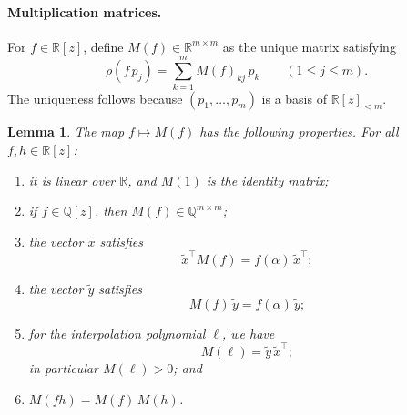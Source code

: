 \documentclass[11pt, a4paper]{article}
\theoremstyle{plain}
\newtheorem{lemma}{Lemma}
\theoremstyle{definition}
\newcommand{\Q}{\mathbb{Q}}
\newcommand{\R}{\mathbb{R}}
\newcommand{\PP}{\R[z]_{<m}}
\begin{document}
\paragraph{Multiplication matrices.}
For $f\in\R[z]$, define $M(f)\in\R^{m\times m}$ as the unique matrix satisfying
\begin{equation}\label{eq:Mdef}
\rho(f\,p_j)=\sum_{k=1}^mM(f)_{kj}\,p_k
\qquad(1\leq j\leq m).
\end{equation}
The uniqueness follows because $(p_1,\dots,p_m)$ is a basis of $\PP$.

\begin{lemma}\label{lem:mult}
The map $f\mapsto M(f)$ has the following properties. For all $f,h\in\R[z]$:
\begin{enumerate}
\item[\emph{(i)}] it is linear over $\R$, and $M(1)$ is the identity matrix;
\item[\emph{(ii)}] if $f\in\Q[z]$, then $M(f)\in\Q^{m\times m}$;
\item[\emph{(iii)}] the vector $\tilde x$ satisfies
\[
\tilde x^{\top}M(f)=f(\alpha)\,\tilde x^{\top};
\]
\item[\emph{(iv)}] the vector $\tilde y$ satisfies
\[
M(f)\,\tilde y=f(\alpha)\,\tilde y;
\]
\item[\emph{(v)}] for the interpolation polynomial $\ell$, we have
\[
M(\ell)=\tilde y\,\tilde x^{\top};
\]
in particular $M(\ell)>0$; and 
\item[\emph{(vi)}] $M(fh)=M(f)\,M(h)$.
\end{enumerate}
\end{lemma}
\end{document}
